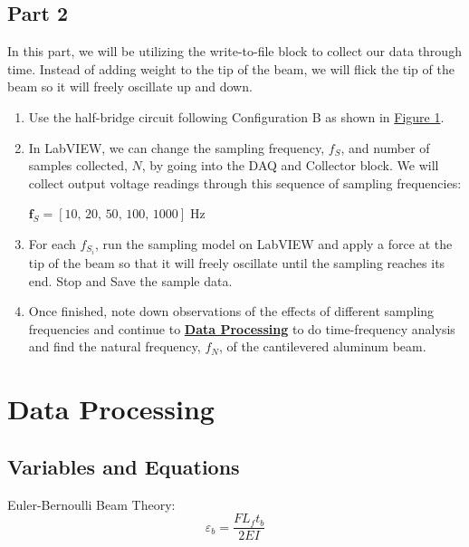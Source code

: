 \documentclass{article}
\begin{document}
\subsection{Part 2}
In this part, we will be utilizing the write-to-file block to collect our data through time. Instead of adding weight to the tip of the beam, we will flick the tip of the beam so it will freely oscillate up and down.

\begin{enumerate}
    \item Use the half-bridge circuit following Configuration B as shown in \hyperlink{fig1}{Figure 1}. 
    \item In LabVIEW, we can change the sampling frequency, $f_{S}$, and number of samples collected, $N$, by going into the DAQ and Collector block. We will collect output voltage readings through this sequence of sampling frequencies:
    \vspace{0.5mm}

    \(\textbf{f}_{S} = \left[10,\, 20,\, 50,\, 100,\, 1000\right]\; \text{Hz}\)

    \item For each $f_{S_{i}}$, run the sampling model on LabVIEW and apply a force at the tip of the beam so that it will freely oscillate until the sampling reaches its end. Stop and Save the sample data.

    \item Once finished, note down observations of the effects of different sampling frequencies and continue to \hyperlink{datapro}{\textbf{Data Processing}} to do time-frequency analysis and find the natural frequency, $f_{N}$, of the cantilevered aluminum beam.
\end{enumerate}

\hypertarget{datapro}{}
\section{Data Processing}
\subsection{Variables and Equations}

Euler-Bernoulli Beam Theory: \\
\begin{equation}
    \label{eq:bending_strain}
    \varepsilon_b = \frac{FL_f t_b}{2EI}
\end{equation}
\end{document}
